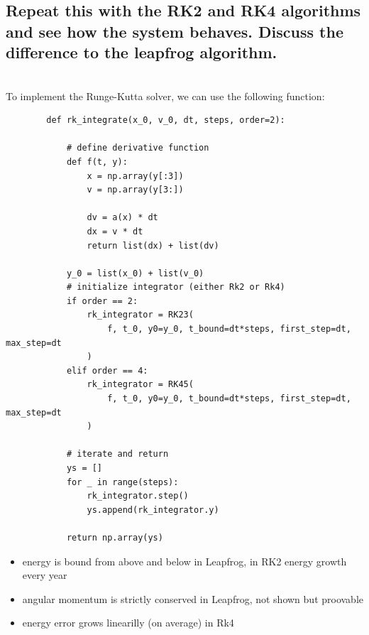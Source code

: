 \newpage
\subsection{Repeat this with the RK2 and RK4 algorithms and see how the 
    system behaves. Discuss the difference to the leapfrog algorithm.
} \ \\
    To implement the Runge-Kutta solver, we can use the following function: \\
    \begin{lstlisting}
        def rk_integrate(x_0, v_0, dt, steps, order=2):
        
            # define derivative function
            def f(t, y):
                x = np.array(y[:3])
                v = np.array(y[3:])
        
                dv = a(x) * dt
                dx = v * dt
                return list(dx) + list(dv)
        
            y_0 = list(x_0) + list(v_0)
            # initialize integrator (either Rk2 or Rk4)
            if order == 2:
                rk_integrator = RK23(
                    f, t_0, y0=y_0, t_bound=dt*steps, first_step=dt, max_step=dt
                )
            elif order == 4:
                rk_integrator = RK45(
                    f, t_0, y0=y_0, t_bound=dt*steps, first_step=dt, max_step=dt
                )
        
            # iterate and return
            ys = []
            for _ in range(steps):
                rk_integrator.step()
                ys.append(rk_integrator.y)
        
            return np.array(ys)\end{lstlisting}
    \begin{itemize}
        \item energy is bound from above and below in Leapfrog, in RK2 energy growth every year
        \item angular momentum is strictly conserved in Leapfrog, not shown but proovable
        \item energy error grows linearilly (on average) in Rk4
    \end{itemize}
    \newpage

